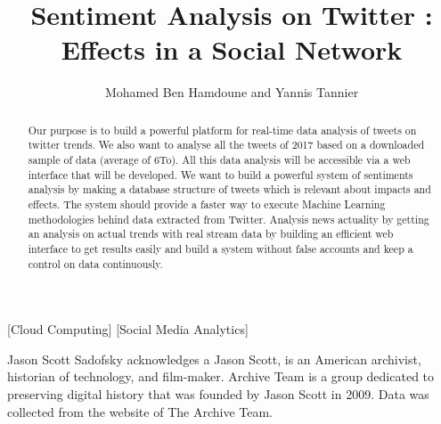 \documentclass{acmtog} %
\begin{document}

\title{Sentiment Analysis on Twitter : Effects in a Social Network} %

\author{Mohamed Ben Hamdoune {\upshape and} Yannis Tannier
}

[Cloud Computing]
[Social Media Analytics]




\maketitle

\begin{bottomstuff}
Jason Scott Sadofsky acknowledges a Jason Scott, is an American archivist, historian of technology, and film-maker. Archive Team is a group dedicated to preserving digital history that was founded by Jason Scott in 2009. Data was collected from the website of The Archive Team.

\end{bottomstuff}


\begin{abstract}

Our purpose is to build a powerful platform for real-time data analysis of tweets on twitter trends. We also want to analyse all the tweets of 2017 based on a downloaded sample of data (average of 6To). All this data analysis will be accessible via a web interface that will be developed. We want to build a powerful system of sentiments analysis by making a database structure of tweets which is relevant about impacts and effects. The system should provide a faster way to execute Machine Learning methodologies behind data extracted from Twitter. Analysis news actuality by getting an analysis on actual trends with real stream data by building an efficient web interface to get results easily and build a system without false accounts and keep a control on data continuously.
\end{abstract}
\end{document}
